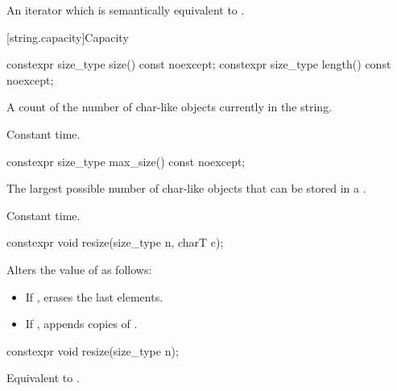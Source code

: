 \begin{itemdescr}
\pnum
\returns
An iterator which is semantically equivalent to
.
\end{itemdescr}

[string.capacity]{Capacity}

%
%
\begin{itemdecl}
constexpr size_type size() const noexcept;
constexpr size_type length() const noexcept;
\end{itemdecl}

\begin{itemdescr}
\pnum
\returns
A count of the number of char-like objects currently in the string.

\pnum
\complexity
Constant time.
\end{itemdescr}

%
\begin{itemdecl}
constexpr size_type max_size() const noexcept;
\end{itemdecl}

\begin{itemdescr}
\pnum
\returns
The largest possible number of char-like objects that can be stored in a
.

\pnum
\complexity
Constant time.
\end{itemdescr}

%
\begin{itemdecl}
constexpr void resize(size_type n, charT c);
\end{itemdecl}

\begin{itemdescr}
\pnum
\effects
Alters the value of
as follows:
\begin{itemize}
\item
If
,
erases the last  elements.
\item
If
,
appends  copies of .
\end{itemize}
\end{itemdescr}

%
\begin{itemdecl}
constexpr void resize(size_type n);
\end{itemdecl}

\begin{itemdescr}
\pnum
\effects
Equivalent to .
\end{itemdescr}

